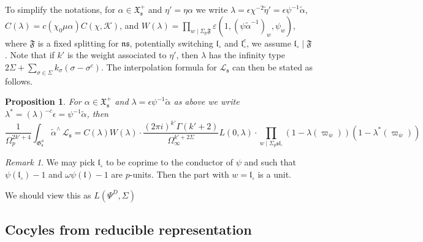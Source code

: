 \documentclass[leqno]{amsart}
\newtheorem{prop}[thm]{Proposition}
\theoremstyle{definition}
\theoremstyle{remark}
\newtheorem{rem}[thm]{Remark}
\newcommand{\fl}{\mathfrak{l}}
\newcommand{\fn}{\mathfrak{n}}
\newcommand{\fs}{\mathfrak{s}}
\newcommand{\K}{{\mathcal{K}}} %
\newcommand{\bw}{\overline{w}}
\newcommand{\fG}{\mathfrak{G}}
\newcommand{\fX}{\mathfrak{X}}
\begin{document}
To simplify the notations,
for $\alpha\in \fX_\fs^+$ and $\eta'=\eta\alpha$
we write $\lambda=
\epsilon \chi^{-2}\tilde{\eta}'=\epsilon\psi^{-1}\tilde{\alpha}$,
$C(\lambda)=c(\chi_0\mu\alpha)C(\chi,\K)$,
and $W(\lambda)=\prod_{w\mid \Sigma_p\mathfrak{F}}
\varepsilon(1,(\psi\tilde{\alpha}^{-1})_w,\psi_w)$,
where $\mathfrak{F}$
is a fixed splitting for $\fn\fs$,
potentially switching $\fl_\circ$ and $\fl_\circ^c$,
we assume $\fl_\circ\mid \mathfrak{F}$.
Note that if $k'$ is the weight associated to $\eta'$,
then $\lambda$ has the infinity type
$2\Sigma+\sum_{\sigma\in \Sigma}k_\sigma(\sigma-\sigma^c)$.
The interpolation formula for $\mathcal{L}_\fs$
can then be stated as follows.
\begin{prop}
For $\alpha\in \fX_\fs^+$ and $\lambda=\epsilon\psi^{-1}\tilde{\alpha}$
as above we write
$\lambda^*=(\lambda)^{-c}\epsilon=\psi^{-1}\tilde{\alpha}$, then
\begin{equation*}
	\frac{1}{\Omega_p^{2k'+4}}
	\int_{\fG_{\fs}^a}\tilde{\alpha}^\wedge\,\mathcal{L}_\fs=
	C(\lambda)W(\lambda)\cdot 
	\frac{(2\pi i)^{k'}\Gamma(k'+2)
	}{\Omega_\infty^{k'+2\Sigma}}
    L(0,\lambda)\cdot
	\prod_{w\mid \Sigma_p\fs\fl_\circ}
	(1-\lambda(\varpi_{\bw}))
	(1-\lambda^*(\varpi_{\bw}))
\end{equation*}
\end{prop}

\begin{rem}
We may pick $\fl_\circ$
to be coprime to the conductor of $\psi$ and
such that $\psi(\fl_\circ)-1$
and $\omega\psi(\fl)-1$ are $p$-units.
Then the part with $w=\fl_\circ$
is a unit.

We should view this 
as $L(\Psi^D,\Sigma)$
\end{rem}





\subsection{Cocyles from reducible representation}
\end{document}
